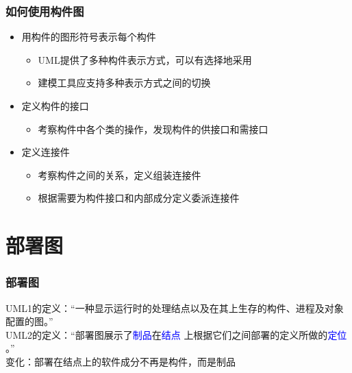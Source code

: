 \documentclass[compress]{beamer}
\begin{document}
\begin{frame}
  \frametitle{如何使用构件图}
  \begin{itemize}
    \item 用构件的图形符号表示每个构件
      \begin{itemize}
        \item UML提供了多种构件表示方式，可以有选择地采用
        \item 建模工具应支持多种表示方式之间的切换
      \end{itemize}

    \item 定义构件的接口 
      \begin{itemize}
        \item 考察构件中各个类的操作，发现构件的供接口和需接口
      \end{itemize}

    \item 定义连接件 
      \begin{itemize}
        \item 考察构件之间的关系，定义组装连接件
        \item 根据需要为构件接口和内部成分定义委派连接件 
      \end{itemize}
  \end{itemize}
\end{frame}

\section{部署图}

\begin{frame}
  \frametitle{部署图}
  UML1的定义：“一种显示运行时的处理结点以及在其上生存的构件、进程及对象
  配置的图。”  \\[2ex]

  UML2的定义：“部署图展示了\textcolor{blue}{制品}在\textcolor{blue}{结点
  }上根据它们之间部署的定义所做的\textcolor{blue}{定位}
  。”\\[2ex]

  变化：部署在结点上的软件成分不再是构件，而是\alert{制品}
\end{frame}
\end{document}
